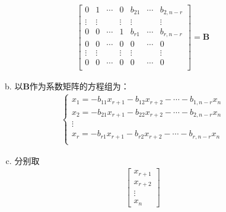 \documentclass[12pt]{book}
\begin{document}
\begin{enumerate}[1.]
\begin{enumerate}[(1)]
\begin{enumerate}[a.]
\begin{gather*}
\begin{bmatrix}
                                      0      & 1      & \cdots & 0      & b_{21} & \cdots & b_{2,n-r} \\
                                      \vdots & \vdots &        & \vdots & \vdots &        & \vdots    \\
                                      0      & 0      & \cdots & 1      & b_{r1} & \cdots & b_{r,n-r} \\
                                      0      & 0      & \cdots & 0      & 0      & \cdots & 0         \\
                                      \vdots & \vdots &        & \vdots & \vdots &        & \vdots    \\
                                      0      & 0      & \cdots & 0      & 0      & \cdots & 0         \\
                                  \end{bmatrix}=\bm{B}
                              \end{gather*}
                        \item 以$\bm{B}$作为系数矩阵的方程组为：
                              \begin{gather*}
                                  \begin{cases}
                                      x_1 = -b_{11} x_{r+1} - b_{12} x_{r+2} - \cdots - b_{1,n-r} x_{n} \\
                                      x_2 = -b_{21} x_{r+1} - b_{22} x_{r+2} - \cdots - b_{2,n-r} x_{n} \\
                                      \vdots                                                            \\
                                      x_r = -b_{r1} x_{r+1} - b_{r2} x_{r+2} - \cdots - b_{r,n-r} x_{n} \\
                                  \end{cases}
                              \end{gather*}
                        \item 分别取
                              \begin{gather*}
                                  \begin{bmatrix}
                                      x_{r+1} \\x_{r+2}\\\vdots\\x_n
                                  \end{bmatrix}

\end{gather*}
\end{enumerate}
\end{enumerate}
\end{enumerate}
\end{document}
